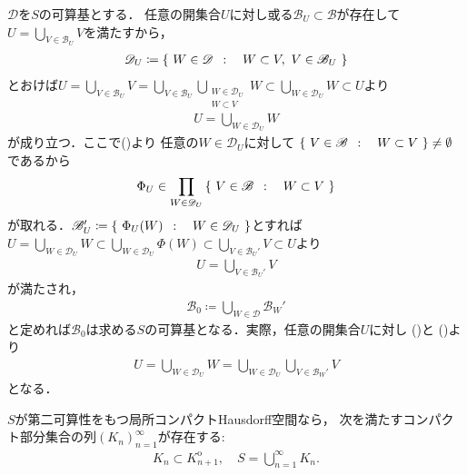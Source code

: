 	\begin{prf}
		$\mathscr{D}$を$S$の可算基とする．
		任意の開集合$U$に対し或る$\mathscr{B}_U \subset \mathscr{B}$が存在して
		$U = \bigcup_{V \in \mathscr{B}_U}V$を満たすから，
		\begin{align}
			\mathscr{D}_U \coloneqq
			\left\{\ W \in \mathscr{D}\ \, : \quad W \subset V,\ V \in \mathscr{B}_U\ \right\}
			\label{eq:thm_countable_base_of_second_countable_space_1}
		\end{align}
		とおけば$U = \bigcup_{V \in \mathscr{B}_U} V
			= \bigcup_{V \in \mathscr{B}_U} \bigcup_{\substack{W \in \mathscr{D}_U \\ W \subset V}} W
			\subset \bigcup_{W \in \mathscr{D}_U} W
			\subset U$より
		\begin{align}
			U = \bigcup_{W \in \mathscr{D}_U} W
			\label{eq:thm_countable_base_of_second_countable_space_2}
		\end{align}
		が成り立つ．ここで()より
		任意の$W \in \mathscr{D}_U$に対して
		$\left\{\ V \in \mathscr{B}\ \, : \quad W \subset V\ \right\} \neq \emptyset$であるから
		\begin{align}
			\Phi_U \in \prod_{W \in \mathscr{D}_U} \left\{\ V \in \mathscr{B}\ \, : \quad W \subset V\ \right\}
		\end{align}
		が取れる．$\mathscr{B}_U' \coloneqq \left\{\ \Phi_U(W)\ \, : \quad W \in \mathscr{D}_U\ \right\}$とすれば
		$U = \bigcup_{W \in \mathscr{D}_U} W \subset \bigcup_{W \in \mathscr{D}_U} \Phi(W)
		\subset \bigcup_{V \in \mathscr{B}_U'} V \subset U$より
		\begin{align}
			U = \bigcup_{V \in \mathscr{B}_U'} V
			\label{eq:thm_countable_base_of_second_countable_space_3}
		\end{align}
		が満たされ，
		\begin{align}
			\mathscr{B}_0 \coloneqq \bigcup_{W \in \mathscr{D}} \mathscr{B}_W'
		\end{align}
		と定めれば$\mathscr{B}_0$は求める$S$の可算基となる．実際，任意の開集合$U$に対し
		()と
		()より
		\begin{align}
			U = \bigcup_{W \in \mathscr{D}_U} W
			= \bigcup_{W \in \mathscr{D}_U} \bigcup_{V \in \mathscr{B}_W'} V
		\end{align}
		となる．
		\QED
	\end{prf}
	
	\begin{screen}
		\begin{thm}\label{thm:second_countable_Hausdorff_sigma_compact}
			$S$が第二可算性をもつ局所コンパクトHausdorff空間なら，
			次を満たすコンパクト部分集合の列$(K_n)_{n=1}^\infty$が存在する:
			\begin{align}
				K_n \subset K_{n+1}^{\mathrm{o}},
				\quad S = \bigcup_{n=1}^\infty K_n.
			\end{align}
		\end{thm}
	\end{screen}
	
